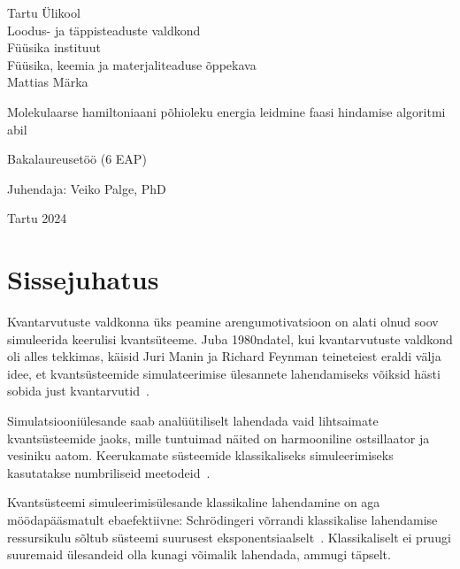 \documentclass[12pt]{report}
\begin{document}
\begin{titlepage}
    \begin{center}
        \large
        {\sc Tartu Ülikool} \\
        Loodus- ja täppisteaduste valdkond \\
        Füüsika instituut \\
        Füüsika, keemia ja materjaliteaduse õppekava \\
    
        \vspace{25mm}
        \Large Mattias Märka
        
        \vspace{4mm}
        \Huge Molekulaarse hamiltoniaani põhioleku energia leidmine faasi hindamise algoritmi abil
    
        \vspace{20mm}
        \Large Bakalaureusetöö (6 EAP)
    
        \vspace{20mm}
        \begin{flushright}
            \Large Juhendaja: Veiko Palge, PhD
        \end{flushright}
    
        \vfill
        \large Tartu 2024
    \end{center}
\end{titlepage}


\tableofcontents

\chapter{Sissejuhatus}

Kvantarvutuste valdkonna üks peamine arengumotivatsioon on alati olnud soov simuleerida keerulisi kvantsüteeme.
Juba 1980ndatel, kui kvantarvutuste valdkond oli alles tekkimas, käisid Juri Manin ja Richard Feynman teineteiest eraldi välja idee, et kvantsüsteemide simulateerimise ülesannete lahendamiseks võiksid hästi sobida just kvantarvutid~\cite{manin, feynman}.

Simulatsiooniülesande saab analüütiliselt lahendada vaid lihtsaimate kvantsüsteemide jaoks, mille tuntuimad näited on harmooniline ostsillaator ja vesiniku aatom.
Keerukamate süsteemide klassikaliseks simuleerimiseks kasutatakse numbriliseid meetodeid~\cite{whitfield+etal2011, szabo+ostlund}.

Kvantsüsteemi simuleerimisülesande klassikaline lahendamine on aga möödapääsmatult ebaefektiivne: Schrödingeri võrrandi klassikalise lahendamise ressursikulu sõltub süsteemi suurusest eksponentsiaalselt~\cite{whitfield+etal2011, mcardle+etal, cao+etal, kassal+etal}.
Klassikaliselt ei pruugi suuremaid ülesandeid olla kunagi võimalik lahendada, ammugi täpselt.
\end{document}
